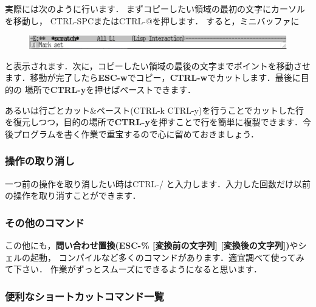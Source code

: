 \documentclass{jarticle}
\begin{document}
実際には次のように行います．
まずコピーしたい領域の最初の文字にカーソルを移動し，
CTRL-SPCまたはCTRL-@を押します．
すると，ミニバッファに

\begin{figure}[ht]
  \begin{center}
    \includegraphics[width=130mm,pagebox=cropbox,clip]{fig/emacs003.pdf}
  \end{center}
\end{figure}

\noindent
と表示されます．次に，コピーしたい領域の最後の文字までポイントを移動させ
ます．移動が完了したら{\bf ESC-w}でコピー，{\bf CTRL-w}でカットします．最後に目的の
場所で{\bf CTRL-y}を押せばペーストできます．

あるいは行ごとカット\&ペースト(CTRL-k CTRL-y)を行うことでカットした行を復元しつつ，目的の場所で{\bf CTRL-y}を押すことで行を簡単に複製できます．今後プログラムを書く作業で重宝するので心に留めておきましょう．

\subsubsection{操作の取り消し}
一つ前の操作を取り消したい時はCTRL-/ と入力します．入力した回数だけ以前
の操作を取り消すことができます．

\subsubsection{その他のコマンド}
この他にも，{\bf 問い合わせ置換(ESC-\% [変換前の文字列] [変換後の文字列])}やシェルの起動，
コンパイルなど多くのコマンドがあります．適宜調べて使ってみて下さい．
作業がずっとスムーズにできるようになると思います．

\subsubsection{便利なショートカットコマンド一覧}
\end{document}
